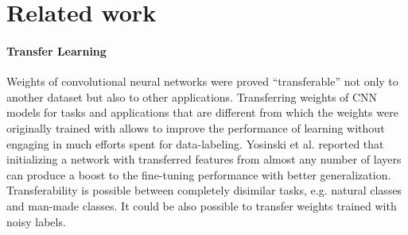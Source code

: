 \section{Related work}
\label{sec:related}

%



\paragraph{Transfer Learning}

Weights of convolutional neural networks were proved ``transferable'' not only to another dataset\cite{shin2016deep,yosinski2014transferable} but also to other applications\cite{girshick2014rich,long2015fully}.
Transferring weights of CNN models for tasks and applications that are different from which the weights were originally trained with allows to improve the performance of learning without engaging in much efforts spent for data-labeling.\cite{pan2010survey}
Yosinski et al.\cite{yosinski2014transferable} reported that initializing a network with transferred features from almost any number of layers can produce a boost to the fine-tuning performance with better generalization.
Transferability is possible between completely disimilar tasks, e.g. natural classes and man-made classes.
It could be also possible to transfer weights trained with noisy labels.

